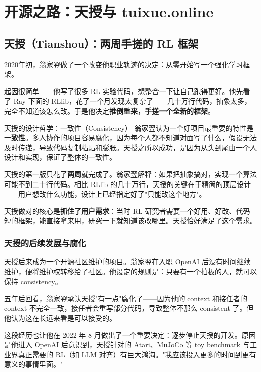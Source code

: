 \section{开源之路：天授与 tuixue.online}

\subsection{天授（Tianshou）：两周手搓的 RL 框架}

2020年初，翁家翌做了一个改变他职业轨迹的决定：从零开始写一个强化学习框架。

起因很简单——他写了很多 RL 实验代码，想整合一下让自己跑得更好。他先看了 Ray 下面的 RLlib，花了一个月发现太复杂了——几十万行代码，抽象太多，完全不知道该怎么改。于是他决定\textbf{推倒重来，手搓一个全新的框架}。

\begin{importantbox}{天授的设计哲学：一致性（Consistency）}
翁家翌认为一个好项目最重要的特性是\textbf{一致性}。多人协作的项目容易腐化，因为每个人都不知道对面写了什么，假设无法及时传递，导致代码复制粘贴和膨胀。天授之所以成功，是因为从头到尾由一个人设计和实现，保证了整体的一致性。
\end{importantbox}

天授的第一版只花了\textbf{两周}就完成了。翁家翌解释：如果把抽象搞对，实现一个算法可能不到二十行代码。相比 RLlib 的几十万行，天授的关键在于精简的顶层设计——用户想改什么功能，设计上已经指定好了"只能改这个地方"。

天授做对的核心是\textbf{抓住了用户需求}：当时 RL 研究者需要一个好用、好改、代码短的框架，能直接拿来用，研究一下就知道该改哪里。天授恰好满足了这个需求。

\subsubsection{天授的后续发展与腐化}

天授后来成为一个开源社区维护的项目。翁家翌在入职 OpenAI 后没有时间继续维护，便将维护权转移给了社区。他设定的规则是：只要有一个拍板的人，就可以保持 consistency。

五年后回看，翁家翌承认天授"有一点"腐化了——因为他的 context 和接任者的 context 不完全一致，接任者会重写部分代码，导致整体不那么 consistent 了。但他认为这在长远来看是可以接受的。

这段经历也让他在 2022 年 8 月做出了一个重要决定：逐步停止天授的开发。原因是他进入 OpenAI 后意识到，天授针对的 Atari、MuJoCo 等 toy benchmark 与工业界真正需要的 RL（如 LLM 对齐）有巨大鸿沟。"我应该投入更多的时间到更有意义的事情里面。"

